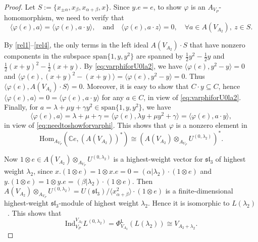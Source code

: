 \documentclass[12pt,a4paper,reqno]{amsart}
\numberwithin{equation}{section}
\numberwithin{equation}{section}
\theoremstyle{definition}
\def \C {\mathbb{C}}
\def \Hom {\mathrm{Hom}}
\def\L{\mathcal{L}}
\def\L{\mathsf{L}}
\def\L{\mathsf{L}}
\begin{document}
\begin{proof}
			Let $S := \{x_{\pm \alpha}, x_{\beta}, x_{\alpha+\beta}, x\}$. 
			Since $y.e = e$, to show $\varphi$ is an $A_{V_P}$-homomorphism, we need to verify that
			\begin{equation}\label{eq:needtoshowforvarphi}
				\langle \varphi(e), a \rangle = \langle \varphi(e), a \cdot y \rangle, 
				\quad \text{and} \quad 
				\langle \varphi(e), a \cdot z \rangle = 0, 
				\quad \forall a \in A(V_{A_2}), \ z \in S.
			\end{equation}
			
			By \eqref{rel1}--\eqref{rel4}, the only terms in the left ideal 
			$A(V_{A_2}) \cdot S$ that have nonzero components in the subspace 
			$\mathrm{span}\{1, y, y^2\}$ are spanned by 
			$\frac{1}{2}y^2 - \frac{1}{2}y$ and 
			$\frac{1}{2}(x+y)^2 - \frac{1}{2}(x+y)$. 
			By \eqref{eq:varphiforU0la2}, we have 
			$\langle \varphi(e), y^2 - y \rangle = 0$ and 
			$\langle \varphi(e), (x+y)^2 - (x+y) \rangle 
			= \langle \varphi(e), y^2 - y \rangle = 0$. 
			Thus $\langle \varphi(e), A(V_{A_2}) \cdot S \rangle = 0$. 
			Moreover, it is easy to show that $C \cdot y \subseteq C$, 
			hence $\langle \varphi(e), a \rangle = 0 = \langle \varphi(e), a \cdot y \rangle$ 
			for any $a \in C$, in view of \eqref{eq:varphiforU0la2}. 
			Finally, for $a = \lambda + \mu y + \gamma y^2 \in \mathrm{span}\{1, y, y^2\}$, 
			we have 
			\[
			\langle \varphi(e), a \rangle 
			= \lambda + \mu + \gamma 
			= \langle \varphi(e), \lambda y + \mu y^2 + \gamma \rangle 
			= \langle \varphi(e), a \cdot y \rangle,
			\]
			in view of \eqref{eq:needtoshowforvarphi}. 
			This shows that $\varphi$ is a nonzero element in 
			$$\Hom_{A_{V_P}}(\C e, (A(V_{A_2}))^\ast) 
			\cong \left(A(V_{A_2}) \otimes_{A_{V_P}} U^{(0, \lambda_2)}\right)^\ast.$$ 
			
			Now $1 \otimes e \in A(V_{A_2}) \otimes_{A_{V_P}} U^{(0, \lambda_2)}$ 
			is a highest-weight vector for $\mathfrak{sl}_3$ of highest weight $\lambda_2$, 
			since 
			$x.(1 \otimes e) = 1 \otimes x.e = 0 = (\alpha | \lambda_2) \cdot (1 \otimes e)$ 
			and 
			$y.(1 \otimes e) = 1 \otimes y.e = (\beta | \lambda_2) \cdot (1 \otimes e)$. 
			Then 
			$A(V_{A_2}) \otimes_{A_{V_P}} U^{(0, \lambda_2)} 
			= U(\mathfrak{sl}_3)/\langle x^2_{\alpha+\beta} \rangle \cdot (1 \otimes e)$ 
			is a finite-dimensional highest-weight $\mathfrak{sl}_3$-module 
			of highest weight $\lambda_2$. 
			Hence it is isomorphic to $L(\lambda_2)$~\cite{V68, Hum2}. 
			This shows that 
			\[
			\mathrm{Ind}^{V_{A_2}}_{V_P} L^{(0, \lambda_2)} 
			= \Phi^\L_{V_{A_2}}(L(\lambda_2)) \cong V_{A_2 + \lambda_2}.
			\]
			

\end{proof}
\end{document}
